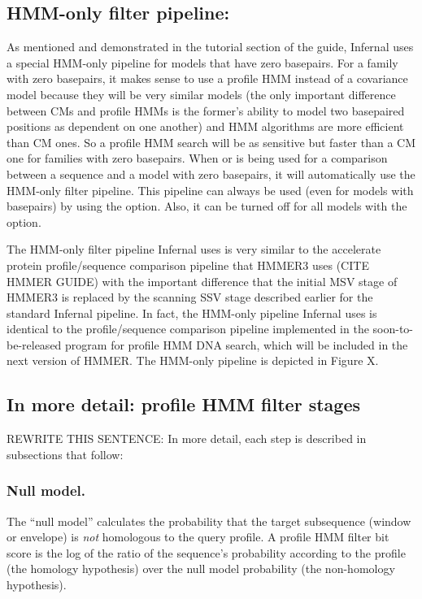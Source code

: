 \subsection{HMM-only filter pipeline:}

As mentioned and demonstrated in the tutorial section of the guide,
Infernal uses a special HMM-only pipeline for models that have zero
basepairs. For a family with zero basepairs, it makes sense to use a
profile HMM instead of a covariance model because they will be very
similar models (the only important difference between CMs and profile
HMMs is the former's ability to model two basepaired positions as
dependent on one another) and HMM algorithms are more efficient than
CM ones. So a profile HMM search will be as sensitive but faster than
a CM one for families with zero basepairs.  When  or
 is being used for a comparison between a sequence and a
model with zero basepairs, it will automatically use the HMM-only
filter pipeline. This pipeline can always be used (even for models
with basepairs) by using the  option. Also, it can be
turned off for all models with the  option.

The HMM-only filter pipeline Infernal uses is very similar to the
accelerate protein profile/sequence comparison pipeline that HMMER3
uses (CITE HMMER GUIDE) with the important difference that the initial
MSV stage of HMMER3 is replaced by the scanning SSV stage described
earlier for the standard Infernal pipeline. In fact, the HMM-only
pipeline Infernal uses is identical to the profile/sequence comparison
pipeline implemented in the soon-to-be-released  program
for profile HMM DNA search, which will be included in the next version
of HMMER. The HMM-only pipeline is depicted in Figure X.

\subsection{In more detail: profile HMM filter stages}

REWRITE THIS SENTENCE: In more detail, each step is described in subsections that follow:

\subsubsection{Null model.}

The ``null model'' calculates the probability that the target subsequence
(window or envelope) is \emph{not} homologous to the query profile. A profile HMM filter
bit score is the log of the ratio of the sequence's probability
according to the profile (the homology hypothesis) over the null model
probability (the non-homology hypothesis).

